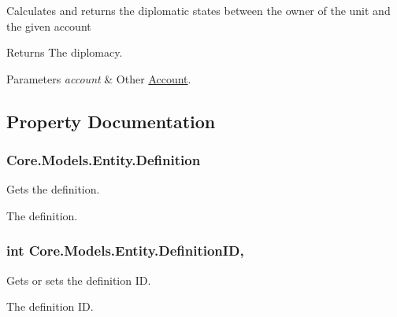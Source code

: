 Calculates and returns the diplomatic states between the owner of the unit and the given account 

\begin{DoxyReturn}{Returns}
The diplomacy.
\end{DoxyReturn}

\begin{DoxyParams}{Parameters}
{\em account} & Other \hyperlink{classCore_1_1Models_1_1Account}{Account}.\\
\hline
\end{DoxyParams}


\subsection{Property Documentation}
\hypertarget{classCore_1_1Models_1_1Entity_a9d7325d3a3958dc2acfe798a2fb5a98c}{}
\subsubsection[{Definition}]{ Core.\+Models.\+Entity.\+Definition\hspace{0.3cm}{\ttfamily [get]}}\label{classCore_1_1Models_1_1Entity_a9d7325d3a3958dc2acfe798a2fb5a98c}


Gets the definition. 

The definition.\hypertarget{classCore_1_1Models_1_1Entity_a451f76265fc15cbcdfc1ac5233bf79e9}{}
\subsubsection[{Definition\+I\+D}]{\setlength{\rightskip}{0pt plus 5cm}int Core.\+Models.\+Entity.\+Definition\+I\+D\hspace{0.3cm}{\ttfamily [get]}, {\ttfamily [set]}}\label{classCore_1_1Models_1_1Entity_a451f76265fc15cbcdfc1ac5233bf79e9}


Gets or sets the definition I\+D. 

The definition I\+D.\hypertarget{classCore_1_1Models_1_1Entity_ac054f7e992fe65ae3ffa998e4d4d1225}{}
